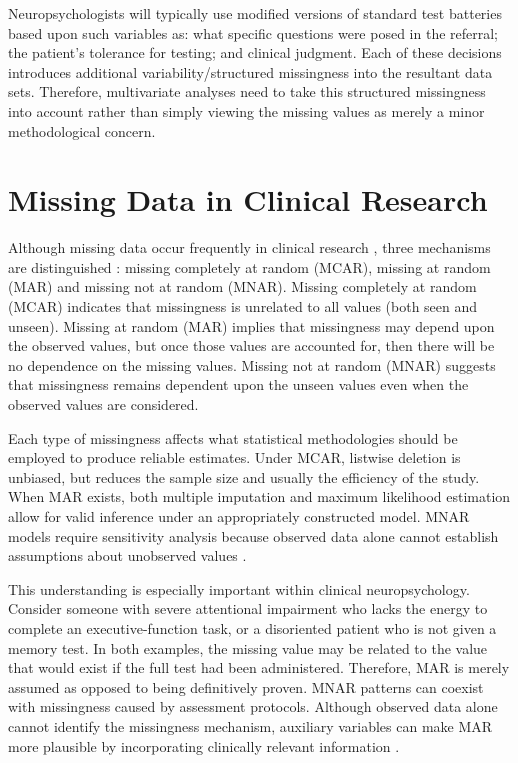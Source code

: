 Neuropsychologists will typically use modified versions of standard test batteries based upon such variables as: what specific questions were posed in the referral; the patient's tolerance for testing; and clinical judgment. Each of these decisions introduces additional variability/structured missingness into the resultant data sets. Therefore, multivariate analyses need to take this structured missingness into account rather than simply viewing the missing values as merely a minor methodological concern.

\section{Missing Data in Clinical Research}
Although missing data occur frequently in clinical research \parencite{gravesteijn2021missing}, three mechanisms are distinguished \textcite{rubin1976inference}: missing completely at random (MCAR), missing at random (MAR) and missing not at random (MNAR). Missing completely at random (MCAR) indicates that missingness is unrelated to all values (both seen and unseen). Missing at random (MAR) implies that missingness may depend upon the observed values, but once those values are accounted for, then there will be no dependence on the missing values. Missing not at random (MNAR) suggests that missingness remains dependent upon the unseen values even when the observed values are considered.

Each type of missingness affects what statistical methodologies should be employed to produce reliable estimates. Under MCAR, listwise deletion is unbiased, but reduces the sample size and usually the efficiency of the study. When MAR exists, both multiple imputation and maximum likelihood estimation allow for valid inference under an appropriately constructed model. MNAR models require sensitivity analysis because observed data alone cannot establish assumptions about unobserved values \parencite{rubin1987multiple}.

This understanding is especially important within clinical neuropsychology. Consider someone with severe attentional impairment who lacks the energy to complete an executive-function task, or a disoriented patient who is not given a memory test. In both examples, the missing value may be related to the value that would exist if the full test had been administered. Therefore, MAR is merely assumed as opposed to being definitively proven. MNAR patterns can coexist with missingness caused by assessment protocols. Although observed data alone cannot identify the missingness mechanism, auxiliary variables can make MAR more plausible by incorporating clinically relevant information \parencite{little2019statistical}.

